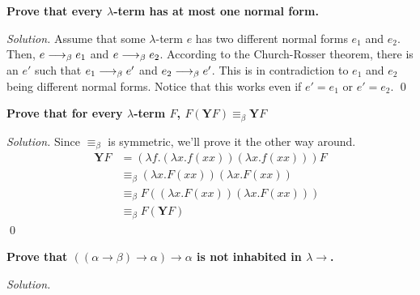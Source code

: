 \textbf{Prove that every $\lambda$-term has at most one normal form.}

\emph{Solution.} Assume that some $\lambda$-term $e$ has two different normal forms $e_1$ and $e_2$. Then, $e \longrightarrow_\beta e_1$ and 
$e \longrightarrow_\beta e_2$. According to the Church-Rosser theorem, there is an $e'$ such that $e_1 \longrightarrow_\beta e'$ and
$e_2 \longrightarrow_\beta e'$. This is in contradiction to $e_1$ and $e_2$ being different normal forms. Notice that this works even if
$e' = e_1$ or $e' = e_2$.
\qed

\textbf{Prove that for every $\lambda$-term $F$, $F (\textbf{Y} F) \equiv_\beta \textbf{Y} F$}

\emph{Solution.} Since $\equiv_\beta$ is symmetric, we'll prove it the other way around.
\[
\begin{array}{rl}
\textbf{Y} F & = (\lambda f. (\lambda x. f (x x)) (\lambda x. f (x x))) F \\
& \equiv_\beta (\lambda x. F (x x)) (\lambda x. F (x x)) \\
& \equiv_\beta F ((\lambda x. F (x x)) (\lambda x. F (x x)))  \\
& \equiv_\beta F (\textbf{Y} F) 
\end{array}
\]
\qed

\textbf{Prove that $((\alpha \to \beta) \to \alpha) \to \alpha$ is not inhabited in $\lambda \to$.}

\emph{Solution.}














